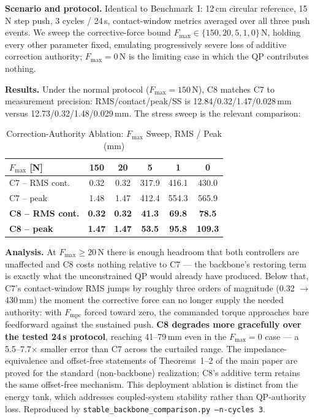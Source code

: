 \documentclass[journal]{IEEEtran}
\newcommand{\Fmpc}{F_{\text{mpc}}}
\begin{document}
\textbf{Scenario and protocol.} Identical to Benchmark~I: 12\,cm
circular reference, 15\,N step push, 3 cycles / 24\,s, contact-window
metrics averaged over all three push events. We sweep the
corrective-force bound $F_\text{max}\in\{150,20,5,1,0\}$\,N, holding
every other parameter fixed, emulating progressively severe loss of
additive correction authority; $F_\text{max}=0$\,N is the limiting case
in which the QP contributes nothing.

\textbf{Results.} Under the normal protocol ($F_\text{max}=150$\,N), C8
matches C7 to measurement precision: RMS/contact/peak/SS is
12.84/0.32/1.47/0.028\,mm versus 12.73/0.32/1.48/0.029\,mm. The stress sweep
is the relevant comparison:

\begin{table}[!t]
\caption{Correction-Authority Ablation: $F_\text{max}$ Sweep, RMS /
Peak (mm)}
\label{tab:backbone}
\renewcommand{\arraystretch}{1.0}
\footnotesize
\setlength{\tabcolsep}{3pt}
\begin{tabular}{lccccc}
\toprule
$F_\text{max}$ [N] & 150 & 20 & 5 & 1 & 0\\
\midrule
C7 -- RMS cont. & 0.32 & 0.32 & 317.9 & 416.1 & 430.0\\
C7 -- peak      & 1.48 & 1.47 & 412.4 & 554.3 & 565.9\\
\textbf{C8 -- RMS cont.} & \textbf{0.32} & \textbf{0.32} & \textbf{41.3} & \textbf{69.8} & \textbf{78.5}\\
\textbf{C8 -- peak}      & \textbf{1.47} & \textbf{1.47} & \textbf{53.5} & \textbf{95.8} & \textbf{109.3}\\
\bottomrule
\end{tabular}
\end{table}

\textbf{Analysis.} At $F_\text{max}\ge20$\,N there is enough headroom
that both controllers are unaffected and C8 costs nothing relative to
C7 --- the backbone's restoring term is exactly what the unconstrained
QP would already have produced. Below that, C7's contact-window RMS
jumps by roughly three orders of magnitude (0.32 $\to$ 430\,mm) the
moment the corrective force can no longer supply the needed authority:
with $\Fmpc$ forced toward zero, the commanded torque approaches bare
feedforward against the sustained push. \textbf{C8 degrades more gracefully
over the tested 24\,s protocol}, reaching 41--79\,mm even in the
$F_\text{max}=0$ case --- a 5.5--7.7$\times$ smaller error than C7 across the
curtailed range. The impedance-equivalence and offset-free
statements of Theorems~1--2 of the main paper are proved for the standard
(non-backbone) realization; C8's additive term retains the same
offset-free mechanism.
This deployment ablation is distinct from the energy tank, which addresses
coupled-system stability rather than QP-authority loss. Reproduced by
\texttt{stable\_backbone\_comparison.py --n-cycles 3}.
\end{document}
